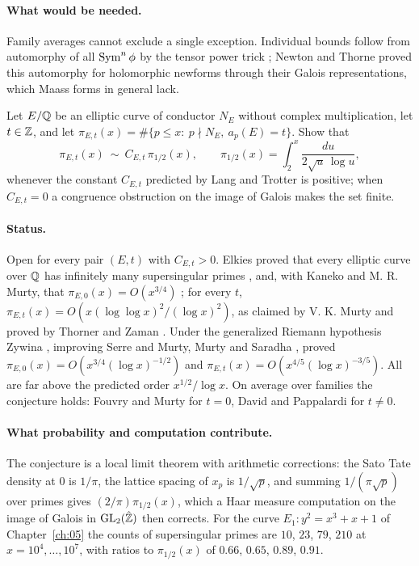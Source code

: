 \paragraph{What would be needed.} Family averages cannot exclude a single exception. Individual bounds follow from automorphy of all $\operatorname{Sym}^n\phi$ by the tensor power trick \cite{langlands1970}; Newton and Thorne proved this automorphy for holomorphic newforms \cite{newtonthorne2021,newtonthorne2021b} through their Galois representations, which Maass forms in general lack.

\begin{problem}\label{op:lt}
Let $E/\mathbb{Q}$ be an elliptic curve of conductor $N_E$ without complex multiplication, let $t\in\mathbb{Z}$, and let $\pi_{E,t}(x)=\#\{p\le x:\ p\nmid N_E,\ a_p(E)=t\}$. Show that
\[
\pi_{E,t}(x)\ \sim\ C_{E,t}\,\pi_{1/2}(x),\qquad \pi_{1/2}(x)=\int_2^x\frac{du}{2\sqrt u\,\log u},
\]
whenever the constant $C_{E,t}$ predicted by Lang and Trotter \cite{langtrotter1976} is positive; when $C_{E,t}=0$ a congruence obstruction on the image of Galois makes the set finite.
\end{problem}

\paragraph{Status.} Open for every pair $(E,t)$ with $C_{E,t}>0$. Elkies proved that every elliptic curve over $\mathbb{Q}$ has infinitely many supersingular primes \cite{elkies1987}, and, with Kaneko and M. R. Murty, that $\pi_{E,0}(x)=O(x^{3/4})$ \cite{elkies1991}; for every $t$, $\pi_{E,t}(x)=O(x(\log\log x)^2/(\log x)^2)$, as claimed by V. K. Murty \cite{murty1997} and proved by Thorner and Zaman \cite{thornerzaman2018}. Under the generalized Riemann hypothesis Zywina \cite{zywina2015}, improving Serre \cite{serre1981} and Murty, Murty and Saradha \cite{murtymurtysaradha1988}, proved $\pi_{E,0}(x)=O(x^{3/4}(\log x)^{-1/2})$ and $\pi_{E,t}(x)=O(x^{4/5}(\log x)^{-3/5})$. All are far above the predicted order $x^{1/2}/\log x$. On average over families the conjecture holds: Fouvry and Murty \cite{fouvrymurty1996} for $t=0$, David and Pappalardi \cite{davidpappalardi1999} for $t\ne0$.

\paragraph{What probability and computation contribute.} The conjecture is a local limit theorem with arithmetic corrections: the Sato Tate density at $0$ is $1/\pi$, the lattice spacing of $x_p$ is $1/\sqrt p$, and summing $1/(\pi\sqrt p)$ over primes gives $(2/\pi)\pi_{1/2}(x)$, which a Haar measure computation on the image of Galois in $\mathrm{GL}_2(\hat{\mathbb{Z}})$ then corrects. For the curve $E_1\colon y^2=x^3+x+1$ of Chapter~\ref{ch:05} the counts of supersingular primes are $10$, $23$, $79$, $210$ at $x=10^4,\dots,10^7$, with ratios to $\pi_{1/2}(x)$ of $0.66$, $0.65$, $0.89$, $0.91$.

